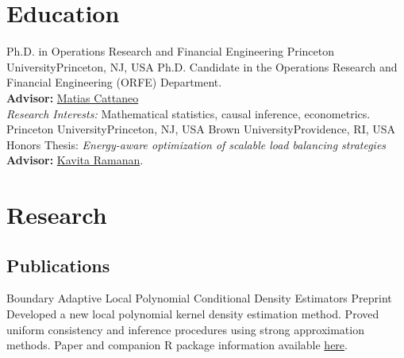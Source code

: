 \documentclass[10pt,a4paper,roman]{moderncv}        %
\begin{document}
\makecvtitle

\section{Education}
{Ph.D. in Operations Research and Financial Engineering}
{Princeton University}{Princeton, NJ, USA}{}
{Ph.D. Candidate in the Operations Research and Financial Engineering (ORFE) Department.\\
\textbf{Advisor: }\color{blue}\href{https://cattaneo.princeton.edu}{Matias Cattaneo}\color{black}\\
\textit{Research Interests:} Mathematical statistics, causal inference, econometrics.}
{Princeton University}{Princeton, NJ, USA}{}{}
{Brown University}{Providence, RI, USA}{}{ Honors Thesis: \textit{Energy-aware optimization of scalable load balancing
    strategies}
  \\
  \textbf{Advisor: } \color{blue}\href{https://www.brown.edu/academics/applied-mathematics/faculty/kavita-ramanan/home}{Kavita Ramanan}\color{black}.}  %


\section{Research}
\subsection{Publications}
{Boundary Adaptive Local Polynomial Conditional Density Estimators}
{Preprint}{}
{Developed a new local polynomial kernel density estimation method.
  Proved uniform consistency and inference procedures using strong approximation
  methods.
  Paper and companion R package information available \color{blue}\href{https://rajitachandak.github.io/publications/}{here}.}
\end{document}
